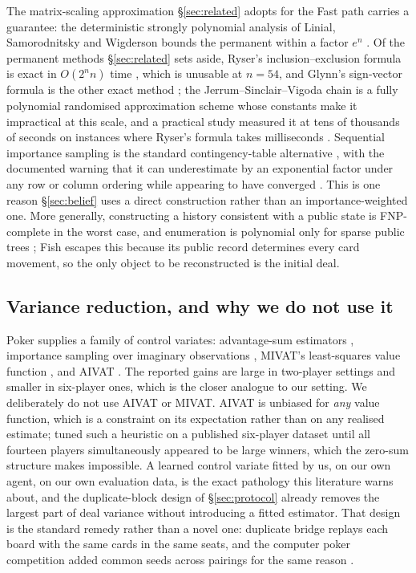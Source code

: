 The matrix-scaling approximation \S\ref{sec:related} adopts for the Fast path
carries a guarantee: the deterministic strongly polynomial analysis of Linial,
Samorodnitsky and Wigderson bounds the permanent within a factor $e^n$
\cite{lsw}. Of the permanent methods \S\ref{sec:related} sets aside, Ryser's
inclusion--exclusion formula is exact in $O(2^n n)$ time \cite{ryser}, which
is unusable at $n = 54$, and Glynn's sign-vector formula is the other exact
method \cite{glynn}; the Jerrum--Sinclair--Vigoda chain is a fully polynomial
randomised approximation scheme \cite{jsv} whose constants make it impractical
at this scale, and a practical study measured it at tens of thousands of
seconds on instances where Ryser's formula takes milliseconds
\cite{newman-vardi}. Sequential importance sampling is the standard
contingency-table alternative \cite{chen-sis}, with the documented warning
that it can underestimate by an exponential factor under any row or column
ordering while appearing to have converged \cite{bezakova-sis}. This is one
reason \S\ref{sec:belief} uses a direct construction rather than an
importance-weighted one. More generally, constructing a history consistent
with a public state is FNP-complete in the worst case, and enumeration is
polynomial only for sparse public trees \cite{solinas-history}; Fish escapes
this because its public record determines every card movement, so the only
object to be reconstructed is the initial deal.

\subsection{Variance reduction, and why we do not use it}

Poker supplies a family of control variates: advantage-sum estimators
\cite{zinkevich-divat}, importance sampling over imaginary observations
\cite{bowling-is}, MIVAT's least-squares value function \cite{white-mivat},
and AIVAT \cite{burch-aivat,avaivat}. The reported gains are large in
two-player settings and smaller in six-player ones, which is the closer
analogue to our setting. We deliberately do not use AIVAT or MIVAT. AIVAT is
unbiased for \emph{any} value function, which is a constraint on its
expectation rather than on any realised estimate; \cite{kim-sandholm} tuned
such a heuristic on a published six-player dataset until all fourteen players
simultaneously appeared to be large winners, which the zero-sum structure
makes impossible. A learned control variate fitted by us, on our own agent, on
our own evaluation data, is the exact pathology this literature warns about,
and the duplicate-block design of \S\ref{sec:protocol} already removes the
largest part of deal variance without introducing a fitted estimator. That
design is the standard remedy rather than a novel one: duplicate bridge
replays each board with the same cards in the same seats, and the computer
poker competition added common seeds across pairings for the same reason
\cite{acpc}.

